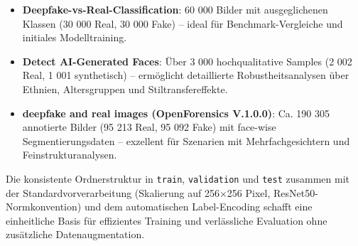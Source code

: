 \begin{itemize}
  \item \textbf{Deepfake-vs-Real-Classification}:  
    60 000 Bilder mit ausgeglichenen Klassen (30 000 Real, 30 000 Fake) – ideal für Benchmark-Vergleiche und initiales Modelltraining.
  \item \textbf{Detect AI-Generated Faces}:  
    Über 3 000 hochqualitative Samples (2 002 Real, 1 001 synthetisch) – ermöglicht detaillierte Robustheitsanalysen über Ethnien, Altersgruppen und Stiltransfereffekte.
  \item \textbf{deepfake and real images (OpenForensics V.1.0.0)}:  
    Ca. 190 305 annotierte Bilder (95 213 Real, 95 092 Fake) mit face-wise Segmentierungsdaten – exzellent für Szenarien mit Mehrfachgesichtern und Feinstrukturanalysen.
\end{itemize}

Die konsistente Ordnerstruktur in \texttt{train}, \texttt{validation} und \texttt{test} zusammen mit der Standardvorverarbeitung (Skalierung auf 256×256 Pixel, ResNet50-Normkonvention) und dem automatischen Label-Encoding schafft eine einheitliche Basis für effizientes Training und verlässliche Evaluation ohne zusätzliche Datenaugmentation.
